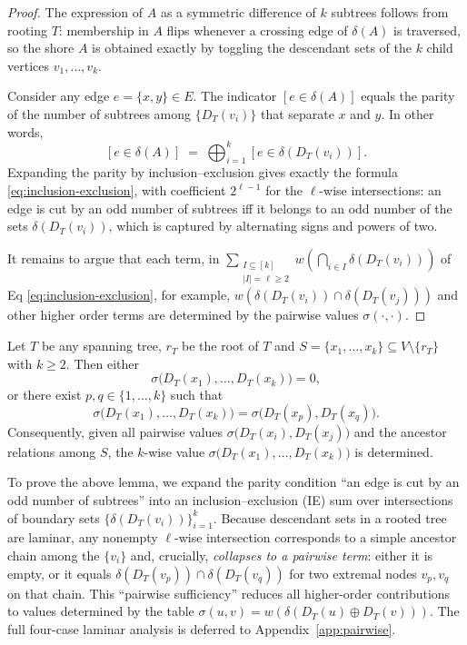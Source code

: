 \documentclass[11pt,letterpaper]{article}
\begin{document}
\begin{proof}
The expression of $A$ as a symmetric difference of $k$ subtrees
follows from rooting $T$: membership in $A$ flips whenever a
crossing edge of $\delta(A)$ is traversed, so the shore $A$
is obtained exactly by toggling the descendant sets of the $k$ child
vertices $v_1,\dots,v_k$.

Consider any edge $e=\{x,y\}\in E$.
The indicator $[e\in \delta(A)]$ equals the parity of the number of
subtrees among $\{D_T(v_i)\}$ that separate $x$ and $y$.
In other words,
\[
[e\in \delta(A)] \;=\; \bigoplus_{i=1}^k [e\in \delta(D_T(v_i))].
\]
Expanding the parity by inclusion--exclusion gives exactly the formula
\eqref{eq:inclusion-exclusion}, with coefficient $2^{\ell-1}$ for the
$\ell$-wise intersections: an edge is cut by an odd number of subtrees
iff it belongs to an odd number of the sets $\delta(D_T(v_i))$,
which is captured by alternating signs and powers of two.

It remains to argue that each term, in $\sum_{\substack{I\subseteq [k]\\ |I|=\ell\geq2}}
  w\!\left( \bigcap_{i\in I} \delta(D_T(v_i)) \right)$ of Eq \ref{eq:inclusion-exclusion}, for example,
$w(\delta(D_T(v_i))\cap \delta(D_T(v_j)))$ and other higher order terms are determined by the pairwise values $\sigma(\cdot,\cdot)$.
\end{proof}
\begin{lemma}\label{lem:pairwise-sufficiency}
Let $T$ be any spanning tree, $r_T$ be the root of $T$ and
$S=\{x_1,\ldots,x_k\}\subseteq V\setminus\{r_T\}$ with $k\ge2$.
Then either
\[
\sigma\bigl(D_T(x_1),\ldots,D_T(x_k)\bigr)=0,
\]
or there exist $p,q\in\{1,\ldots,k\}$ such that
\[
\sigma\bigl(D_T(x_1),\ldots,D_T(x_k)\bigr)
=\sigma\bigl(D_T(x_p),D_T(x_q)\bigr).
\]
Consequently, given all pairwise values
$\sigma\bigl(D_T(x_i),D_T(x_j)\bigr)$ and the ancestor relations among $S$,
the $k$-wise value $\sigma\bigl(D_T(x_1),\ldots,D_T(x_k)\bigr)$ is determined.
\end{lemma}
To prove the above lemma, we expand the parity condition ``an edge is cut by an odd number of subtrees''
into an inclusion--exclusion (IE) sum over intersections of boundary sets
$\{\delta(D_T(v_i))\}_{i=1}^k$.
Because descendant sets in a rooted tree are laminar, any nonempty
$\ell$-wise intersection corresponds to a simple ancestor chain among
the $\{v_i\}$ and, crucially, \emph{collapses to a pairwise term}:
either it is empty, or it equals $\delta(D_T(v_p))\cap\delta(D_T(v_q))$
for two extremal nodes $v_p,v_q$ on that chain.
This ``pairwise sufficiency'' reduces all higher-order contributions
to values determined by the table $\sigma(u,v)=w(\delta(D_T(u)\oplus D_T(v)))$.
The full four-case laminar analysis is deferred to
Appendix~\ref{app:pairwise}.
\end{document}

